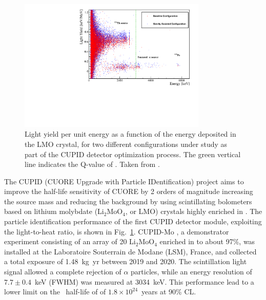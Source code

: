 \begin{figure}[t!b!]
\begin{center}
\includegraphics[width=0.8\textwidth]{img/cupid.pdf}
\end{center}
\caption{Light yield per unit energy as a function of the energy deposited in the LMO crystal, for two different configurations under study as part of the CUPID detector optimization process. The green vertical line indicates the Q-value of . Taken from \cite{CUPID:2022opf}.} \label{fig:cupid}
\end{figure}

The CUPID (CUORE Upgrade with Particle IDentification) \cite{CUPID:2019imh} project aims to improve the half-life sensitivity of CUORE by 2 orders of magnitude increasing the source mass and reducing the background by using scintillating bolometers based on lithium molybdate (Li$_2$MoO$_4$, or LMO) crystals highly enriched in . The particle identification performance of the first CUPID detector module, exploiting the light-to-heat ratio, is shown in Fig.~\ref{fig:cupid}. CUPID-Mo \cite{Augier:2022znx}, a demonstrator experiment consisting of an array of 20 Li$_2$MoO$_4$ enriched in  to about 97\%, was installed at the Laboratoire Souterrain de Modane (LSM), France, and collected a total exposure of 1.48~kg~yr between 2019 and 2020. The scintillation light signal allowed a complete rejection of $\alpha$ particles, while an energy resolution of $7.7\pm0.4$~keV (FWHM) was measured at 3034~keV. This performance lead to a lower limit on the \bbonu\ half-life of  of $1.8\times10^{24}$~years at 90\% CL. 

